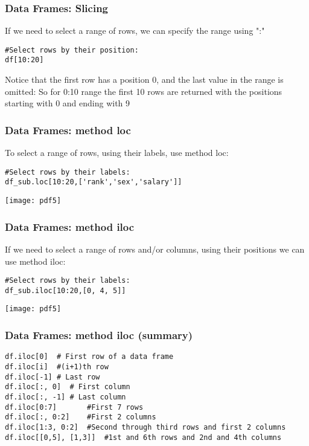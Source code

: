 \begin{frame}[fragile]
\frametitle{Data Frames: Slicing}
If we need to select a range of rows, we can specify the range using ":" 

\begin{lstlisting}
#Select rows by their position:
df[10:20]
\end{lstlisting}
Notice that the first row has a position 0, and the last value in the range is omitted:
So for 0:10 range the first 10 rows are returned with the positions starting with 0 and ending with 9
\end{frame}


\begin{frame}[fragile]
\frametitle{Data Frames: method loc}
To select a range of rows, using their labels, use method loc:

\begin{lstlisting}
#Select rows by their labels:
df_sub.loc[10:20,['rank','sex','salary']]
\end{lstlisting}
\begin{center}
\texttt{[image: pdf5]}
\end{center}
\end{frame}

\begin{frame}[fragile]
\frametitle{Data Frames: method iloc}
If we need to select a range of rows and/or columns, using their positions we can use method iloc:
\begin{lstlisting}
#Select rows by their labels:
df_sub.iloc[10:20,[0, 4, 5]]
\end{lstlisting}
\begin{center}
\texttt{[image: pdf5]}
\end{center}
\end{frame}

\begin{frame}[fragile]
\frametitle{Data Frames: method iloc (summary)}
\begin{lstlisting}
df.iloc[0]  # First row of a data frame
df.iloc[i]  #(i+1)th row 
df.iloc[-1] # Last row 
df.iloc[:, 0]  # First column
df.iloc[:, -1] # Last column 
df.iloc[0:7]       #First 7 rows 
df.iloc[:, 0:2]    #First 2 columns
df.iloc[1:3, 0:2]  #Second through third rows and first 2 columns
df.iloc[[0,5], [1,3]]  #1st and 6th rows and 2nd and 4th columns
\end{lstlisting}

\end{frame}

